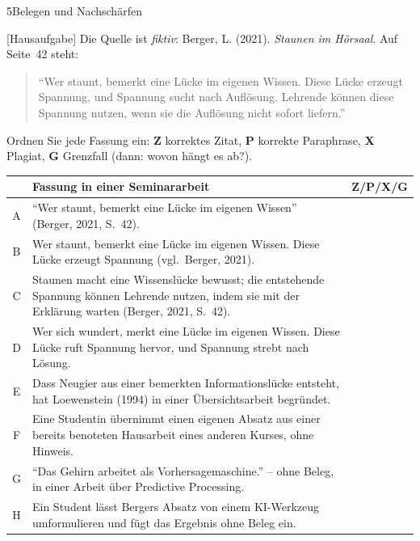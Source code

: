 \begin{uebungsblattb}{5}{Belegen und Nachschärfen}

[Hausaufgabe]
Die Quelle ist \emph{fiktiv}: Berger, L. (2021). \emph{Staunen im Hörsaal}.
Auf Seite~42 steht:
\begin{quote}\small
\enquote{Wer staunt, bemerkt eine Lücke im eigenen Wissen. Diese Lücke
erzeugt Spannung, und Spannung sucht nach Auflösung. Lehrende können diese
Spannung nutzen, wenn sie die Auflösung nicht sofort liefern.}
\end{quote}
Ordnen Sie jede Fassung ein: \textbf{Z} korrektes Zitat, \textbf{P}
korrekte Paraphrase, \textbf{X} Plagiat, \textbf{G} Grenzfall (dann:
wovon hängt es ab?).

\begin{center}\small
\renewcommand{\arraystretch}{1.5}
\begin{tabular}{|c|p{}|p{}|}
\hline
 & \textbf{Fassung in einer Seminararbeit} & \textbf{Z/P/X/G} \\
\hline
A & \enquote{Wer staunt, bemerkt eine Lücke im eigenen Wissen} (Berger, 2021, S.~42). & \\ \hline
B & Wer staunt, bemerkt eine Lücke im eigenen Wissen. Diese Lücke erzeugt Spannung (vgl.\ Berger, 2021). & \\ \hline
C & Staunen macht eine Wissenslücke bewusst; die entstehende Spannung können Lehrende nutzen, indem sie mit der Erklärung warten (Berger, 2021, S.~42). & \\ \hline
D & Wer sich wundert, merkt eine Lücke im eigenen Wissen. Diese Lücke ruft Spannung hervor, und Spannung strebt nach Lösung. & \\ \hline
E & Dass Neugier aus einer bemerkten Informationslücke entsteht, hat Loewenstein (1994) in einer Übersichtsarbeit begründet. & \\ \hline
F & Eine Studentin übernimmt einen eigenen Absatz aus einer bereits benoteten Hausarbeit eines anderen Kurses, ohne Hinweis. & \\ \hline
G & \enquote{Das Gehirn arbeitet als Vorhersagemaschine.} -- ohne Beleg, in einer Arbeit über Predictive Processing. & \\ \hline
H & Ein Student lässt Bergers Absatz von einem KI-Werkzeug umformulieren und fügt das Ergebnis ohne Beleg ein. & \\ \hline
\end{tabular}
\end{center}


\end{uebungsblattb}
